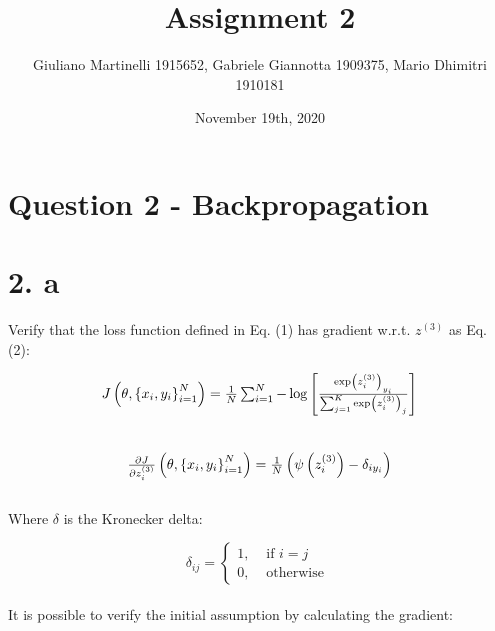 \documentclass[
	12pt, %
]{fphw}
\title{Assignment 2} %
\author{Giuliano Martinelli 1915652, Gabriele Giannotta 1909375, Mario Dhimitri 1910181 } %
\date{November 19th, 2020} %
\institute{Sapienza Università di Roma \\ Data Science} %
\begin{document}
\maketitle %


\section*{Question 2 - Backpropagation}
\section* {2. a}

Verify that the loss function defined in Eq. (1) has gradient w.r.t. $z^{(3)}$ as Eq. (2):

\begin{equation}
\begin{gathered}
$$
J\left(\theta,\left\{x_{i}, y_{i}\right\}_{i=1}^{N}\right)=\frac{1}{N} \sum_{i=1}^{N}-\log \left[\frac{\exp \left(z_{i}^{(3)}\right)_{y_{i}}}{\sum_{j=1}^{K} \exp \left(z_{i}^{(3)}\right)_{j}}\right]
$$
\end{gathered}
\end{equation}
\\
\begin{equation}
\begin{gathered}
$$
\frac{\partial J}{\partial z_{i}^{(3)}}\left(\theta,\left\{x_{i}, y_{i}\right\}_{i=1}^{N}\right)=\frac{1}{N}\left(\psi\left(z_{i}^{(3)}\right)-\delta_{i y_{i}}\right)
$$
\end{gathered}
\end{equation}
\\
Where $\delta$ is the Kronecker delta:

$$
\delta_{i j}=\left\{\begin{array}{ll}
1, & \text { if } i=j \\
0, & \text { otherwise }
\end{array}\right.
$$
\\
It is possible to verify the initial assumption by calculating the gradient:
\end{document}
